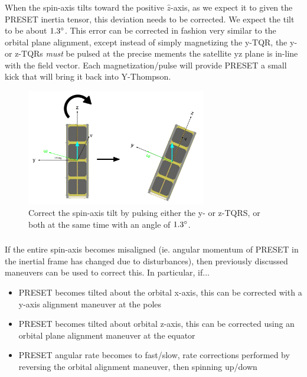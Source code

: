 \documentclass{article}
\begin{document}
\subsubsection{\color{black}{Spin-Axis Tilt Correction}}

When the spin-axis tilts toward the positive $\hat{z}$-axis, as we expect it to given the PRESET inertia tensor, this deviation needs to be corrected. We expect the tilt to be about $1.3 \degree$. This error can be corrected in fashion very similar to the orbital plane alignment, except instead of simply magnetizing the y-TQR, the y- or z-TQRs \textit{must} be pulsed at the precise mements the satellite yz plane is in-line with the field vector. Each magnetization/pulse will provide PRESET a small kick that will bring it back into Y-Thompson.

\begin{figure}[H]
    \centering
    \includegraphics[width=0.7\textwidth]{Spin-Axis Tilt Correction.png}
    \caption{Correct the spin-axis tilt by pulsing either the y- or z-TQRS, or both at the same time with an angle of $1.3 \degree$.}
    \label{fig:enter-label}
\end{figure}

\subsubsection{\color{black}{Spin-Axis Realignment Corrections}}

If the entire spin-axis becomes misaligned (ie. angular momentum of PRESET in the inertial frame has changed due to disturbances), then previously discussed maneuvers can be used to correct this. In particular, if...

\begin{itemize}
	\item PRESET becomes tilted about the orbital x-axis, this can be corrected with a y-axis alignment maneuver at the poles
	\item PRESET becomes tilted about orbital z-axis, this can be corrected using an orbital plane alignment maneuver at the equator
	\item PRESET angular rate becomes to fast/slow, rate corrections performed by reversing the orbital alignment maneuver, then spinning up/down
\end{itemize}
\end{document}
